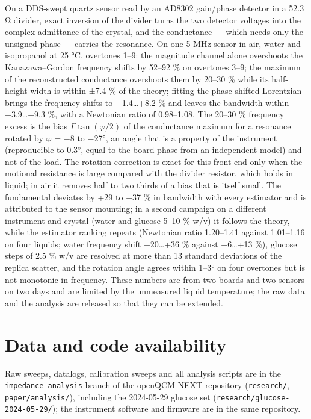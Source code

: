 \documentclass[11pt,a4paper]{article}
\begin{document}
On a DDS-swept quartz sensor read by an AD8302 gain/phase detector in a
52.3 Ω divider, exact inversion of the divider turns the two detector
voltages into the complex admittance of the crystal, and the conductance
--- which needs only the unsigned phase --- carries the resonance. On
one 5 MHz sensor in air, water and isopropanol at 25 °C, overtones 1--9:
the magnitude channel alone overshoots the Kanazawa--Gordon frequency
shifts by 52--92 \% on overtones 3--9; the maximum of the reconstructed
conductance overshoots them by 20--30 \% while its half-height width is
within ±7.4 \% of the theory; fitting the phase-shifted Lorentzian
brings the frequency shifts to −1.4\ldots+8.2 \% and leaves the
bandwidth within −3.9\ldots+9.3 \%, with a Newtonian ratio of
0.98--1.08. The 20--30 \% frequency excess is the bias
\(\Gamma\tan(\varphi/2)\) of the conductance maximum for a resonance
rotated by \(\varphi\) = −8 to −27°, an angle that is a property of the
instrument (reproducible to 0.3°, equal to the board phase from an
independent model) and not of the load. The rotation correction is exact
for this front end only when the motional resistance is large compared
with the divider resistor, which holds in liquid; in air it removes half
to two thirds of a bias that is itself small. The fundamental deviates
by +29 to +37 \% in bandwidth with every estimator and is attributed to
the sensor mounting; in a second campaign on a different instrument and
crystal (water and glucose 5--10 \% w/v) it follows the theory, while
the estimator ranking repeats (Newtonian ratio 1.20--1.41 against
1.01--1.16 on four liquids; water frequency shift +20\ldots+36 \%
against +6\ldots+13 \%), glucose steps of 2.5 \% w/v are resolved at
more than 13 standard deviations of the replica scatter, and the
rotation angle agrees within 1--3° on four overtones but is not
monotonic in frequency. These numbers are from two boards and two
sensors on two days and are limited by the unmeasured liquid
temperature; the raw data and the analysis are released so that they can
be extended.

\hypertarget{data-and-code-availability}{%
\section{Data and code availability}\label{data-and-code-availability}}

Raw sweeps, datalogs, calibration sweeps and all analysis scripts are in
the \texttt{impedance-analysis} branch of the openQCM NEXT repository
(\texttt{research/}, \texttt{paper/analysis/}), including the 2024-05-29
glucose set (\texttt{research/glucose-2024-05-29/}); the instrument
software and firmware are in the same repository.



\end{document}
